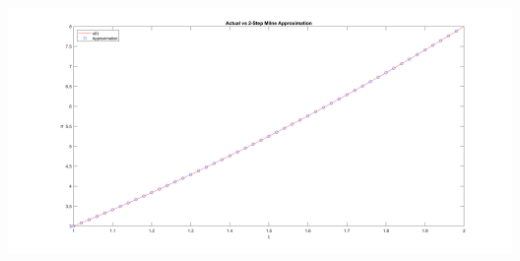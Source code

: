 \begin{solution}
    \begin{center}
        \includegraphics[scale=0.15]{2.PNG}
    \end{center}

\end{solution}

\newpage
